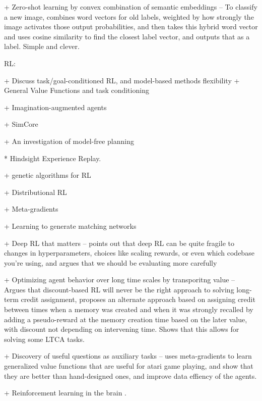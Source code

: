 + Zero-shot learning by convex combination of semantic embeddings -- To classify a new image, combines word vectors for old labels, weighted by how strongly the image activates those output probabilities, and then takes this hybrid word vector and uses cosine similarity to find the closest label vector, and outputs that as a label. Simple and clever. \citep{Norouzi2014}



RL:

+ Discuss task/goal-conditioned RL, and model-based methods flexibility
    + General Value Functions and task conditioning \citep{Sutton2011}

+ Imagination-augmented agents \citep{Racaniere2017}

+ SimCore

+ An investigation of model-free planning \citep{Guez2019}

* Hindsight Experience Replay. \citep{Andrychowicz2017}

+ genetic algorithms for RL \citep{Petroski2018}

+ Distributional RL \citep{Bellemare2017}

+ Meta-gradients \citep{Xu2018a}

+ Learning to generate matching networks \citep{Li2019a}

+ Deep RL that matters -- points out that deep RL can be quite fragile to changes in hyperparameters, choices like scaling rewards, or even which codebase you're using, and argues that we should be evaluating more carefully \citep{Henderson2018}

+ Optimizing agent behavior over long time scales by transporitng value -- Argues that discount-based RL will never be the right approach to solving long-term credit assignment, proposes an alternate approach based on assigning credit between times when a memory was created and when it was strongly recalled by adding a pseudo-reward at the memory creation time based on the later value, with discount not depending on intervening time. Shows that this allows for solving some LTCA tasks. \citep{Hung2019}

+ Discovery of useful questions as auxiliary tasks -- uses meta-gradients to learn generalized value functions that are useful for atari game playing, and show that they are better than hand-designed ones, and improve data effiency of the agents. \citep{Veeriah2019}

+ Reinforcement learning in the brain \citep{Niv2009}.

